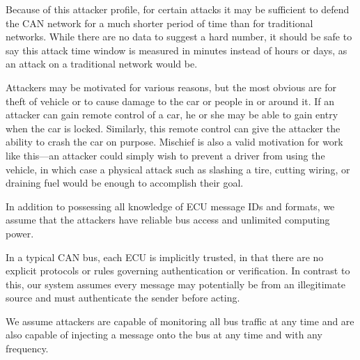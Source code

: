 Because of this attacker profile, for certain attacks it may be sufficient to defend the CAN network for a much shorter period of time than for traditional networks. While there are no data to suggest a hard number, it should be safe to say this attack time window is measured in minutes instead of hours or days, as an attack on a traditional network would be. 


Attackers may be motivated for various reasons, but the most obvious are for theft of vehicle or to cause damage to the car or people in or around it. If an attacker can gain remote control of a car, he or she may be able to gain entry when the car is locked. Similarly, this remote control can give the attacker the ability to crash the car on purpose. Mischief is also a valid motivation for work like this---an attacker could simply wish to prevent a driver from using the vehicle, in which case a physical attack such as slashing a tire, cutting wiring, or draining fuel would be enough to accomplish their goal.

In addition to possessing all knowledge of ECU message IDs and formats, we assume that the attackers have reliable bus access and unlimited computing power.


In a typical CAN bus, each ECU is implicitly trusted, in that there are no explicit protocols or rules governing authentication or verification. In contrast to this, our system assumes every message may potentially be from an illegitimate source and must authenticate the sender before acting. 

We assume attackers are capable of monitoring all bus traffic at any time and are also capable of injecting a message onto the bus at any time and with any frequency.